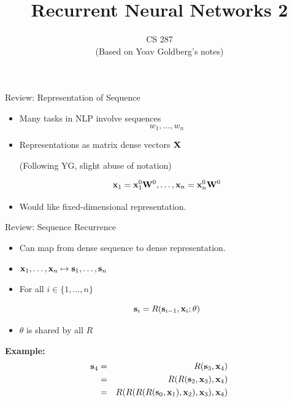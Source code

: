 \documentclass{beamer}
\title{Recurrent Neural Networks 2}
\date{}
\author{CS 287 \\ (Based on Yoav Goldberg's notes)}
\begin{document}
\begin{frame}
  \titlepage
\end{frame}

\begin{frame}{Review: Representation of Sequence}
  \begin{itemize}
  \item   Many tasks in NLP involve sequences
  \[w_1, \ldots, w_n\] 

  \air
   \item Representations as matrix dense vectors $\mathbf{X}$ 

  (Following YG, slight abuse of notation)

  \[\mathbf{x}_1 =  \mathbf{x}^0_1 \mathbf{W}^0, \ldots, \mathbf{x}_n =\mathbf{x}^0_n \mathbf{W}^0 \]

  \item Would like fixed-dimensional representation.
  
  \end{itemize}
\end{frame}

\begin{frame}{Review: Sequence Recurrence}
  \begin{itemize}
  \item Can map from dense sequence to dense representation.

  \item $\mathbf{x}_1, \ldots, \mathbf{x}_n \mapsto \mathbf{s}_1, \ldots, \mathbf{s}_n$

  \item For all $i \in \{1, \ldots, n \}$ 

      \[\mathbf{s}_{i} = R(\mathbf{s}_{i-1}, \mathbf{x}_i; \theta) \]
    \item $\theta$ is shared by all $R$
  \end{itemize}

  \textbf{Example:} 
  \begin{eqnarray*}
    \mathbf{s}_4 &=& R(\mathbf{s}_3, \mathbf{x}_4) \\ 
             &=& R(R(\mathbf{s}_2, \mathbf{x}_3), \mathbf{x}_4) \\ 
             &=& R(R(R(R(\mathbf{s}_0,\mathbf{x}_1), \mathbf{x}_2), \mathbf{x}_3), \mathbf{x}_4) \\ 
  \end{eqnarray*}
\end{frame}
\end{document}
